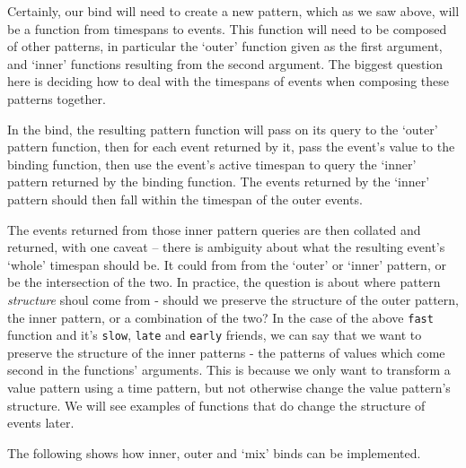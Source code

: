 Certainly, our bind will need to create a new pattern, which as we saw
above, will be a function from timespans to events. This function will
need to be composed of other patterns, in particular the `outer'
function given as the first argument, and `inner' functions resulting
from the second argument. The biggest question here is deciding how to
deal with the timespans of events when composing these patterns
together.

In the bind, the resulting pattern function will pass on its query to
the `outer' pattern function, then for each event returned by it, pass
the event's value to the binding function, then use the event's active
timespan to query the `inner' pattern returned by the binding function.
The events returned by the `inner' pattern should then fall within the
timespan of the outer events.

The events returned from those inner pattern queries are then collated
and returned, with one caveat -- there is ambiguity about what the
resulting event's `whole' timespan should be. It could from from the
`outer' or `inner' pattern, or be the intersection of the two. In
practice, the question is about where pattern \emph{structure} shoul
come from - should we preserve the structure of the outer pattern, the
inner pattern, or a combination of the two? In the case of the above
\texttt{fast} function and it's \texttt{slow}, \texttt{late} and
\texttt{early} friends, we can say that we want to preserve the
structure of the inner patterns - the patterns of values which come
second in the functions' arguments. This is because we only want to
transform a value pattern using a time pattern, but not otherwise change
the value pattern's structure. We will see examples of functions that do
change the structure of events later.

The following shows how inner, outer and `mix' binds can be implemented.

